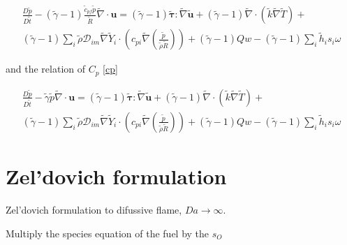 \documentclass[preprint,12pt,authoryear]{elsarticle}
\begin{document}
\begin{equation}
\begin{split}
        \frac{D \tilde{p}}{D\tilde{t}}
	-
	(\tilde{\gamma}-1)
	\frac{\tilde{c}_{pf} \tilde{p} }  {\tilde{R}}
	\tilde{\nabla}\cdot{\mathbf{u}}
        =
	(\tilde{\gamma}-1)
        \pmb{\tilde{\tau}}:\tilde{\nabla} \tilde{\mathbf{u}} 
        + 
	(\tilde{\gamma}-1)
        \tilde{\nabla} \cdot (\tilde{k}\tilde{\nabla} \tilde{T})
        +
	\\
	(\tilde{\gamma}-1)
        \sum\limits_i 
        \tilde{\rho}
        \mathcal{D}_{im}
        \tilde{\nabla}
        \tilde{Y}_i     
        \cdot
        \left(
                c_{pi}
                \tilde{\nabla}
                \left(
                	\frac{\tilde{p}}{\tilde{\rho}\tilde{R}}
                \right)
        \right)
	+
	(\tilde{\gamma}-1)
	Qw
	-
	(\tilde{\gamma}-1)
        \sum\limits_i
	\tilde{h}_i
        s_i \omega	
\end{split}
\end{equation}

and the relation of $C_p$ \ref{cp} 

\begin{equation}
\begin{split}
        \frac{D \tilde{p}}{D\tilde{t}}
	-
	\tilde{\gamma}
	\tilde{p} 
	\tilde{\nabla}\cdot{\mathbf{u}}
        =
	(\tilde{\gamma}-1)
        \pmb{\tilde{\tau}}:\tilde{\nabla} \tilde{\mathbf{u}} 
        + 
	(\tilde{\gamma}-1)
        \tilde{\nabla} \cdot (\tilde{k}\tilde{\nabla} \tilde{T})
        +
	\\
	(\tilde{\gamma}-1)
        \sum\limits_i 
        \tilde{\rho}
        \mathcal{D}_{im}
        \tilde{\nabla}
        \tilde{Y}_i     
        \cdot
        \left(
                c_{pi}
                \tilde{\nabla}
                \left(
                	\frac{\tilde{p}}{\tilde{\rho}\tilde{R}}
                \right)
        \right)
	+
	(\tilde{\gamma}-1)
	Qw
	-
	(\tilde{\gamma}-1)
        \sum\limits_i
	\tilde{h}_i
        s_i \omega	
\end{split}
\end{equation}


\section{Zel'dovich formulation}

Zel'dovich formulation to difussive  flame, $Da\to \infty$.

Multiply the species equation of the fuel by the $s_O$ 
\end{document}
